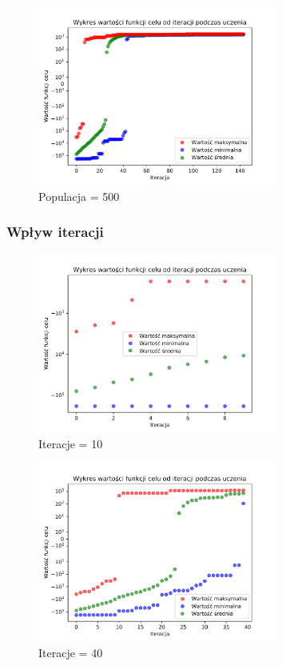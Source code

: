 \documentclass[a4paper]{article}
\begin{document}
\begin{figure}[H]
    \centering
    \includegraphics[width=0.7\textwidth]{plots/population_500.pdf}
    \caption{Populacja = 500}
    \label{fig:population_500}
\end{figure}


\subsubsection{Wpływ iteracji}

\begin{figure}[H]
    \centering
    \includegraphics[width=0.7\textwidth]{plots/iteration_10.pdf}
    \caption{Iteracje = 10}
    \label{fig:iteration_10}
\end{figure}

\begin{figure}[H]
    \centering
    \includegraphics[width=0.7\textwidth]{plots/iteration_40.pdf}
    \caption{Iteracje = 40}
    \label{fig:iteration_40}
\end{figure}
\end{document}
